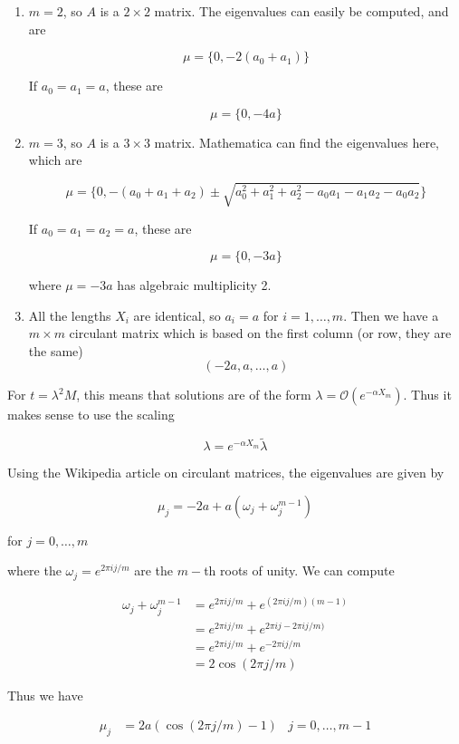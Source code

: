 \documentclass[12pt]{article}
\begin{document}
\begin{enumerate}
\item $m = 2$, so $A$ is a $2 \times 2$ matrix. The eigenvalues can easily be computed, and are

\[
\mu = \{ 0, -2(a_0 + a_1) \}
\]

If $a_0 = a_1 = a$, these are

\[
\mu = \{ 0, -4a \}
\]

\item $m = 3$, so $A$ is a $3 \times 3$ matrix. Mathematica can find the eigenvalues here, which are

\[
\mu = \{0,  -(a_0 + a_1 + a_2) \pm 
\sqrt{ a_0^2 + a_1^2 + a_2^2 - a_0 a_1 - a_1 a_2 - a_0 a_2 }\}
\]

If $a_0 = a_1 = a_2 = a$, these are

\[
\mu = \{0,  -3a \}
\]

where $\mu = -3a$ has algebraic multiplicity 2.


\item All the lengths $X_i$ are identical, so $a_i = a$ for $i = 1, \dots, m$. Then we have a $m \times m$ circulant matrix which is based on the first column (or row, they are the same)
\[
(-2a, a, \dots, a)
\]
\end{enumerate}

For $t = \lambda^2 M$, this means that solutions are of the form $\lambda = \mathcal{O}( e^{-\alpha X_m} )$. Thus it makes sense to use the scaling

\[
\lambda = e^{-\alpha X_m} \tilde{\lambda}
\] 

Using the Wikipedia article on circulant matrices, the eigenvalues are given by

\[
\mu_j = -2a + a( \omega_j + \omega_j^{m-1} )
\]

for $j = 0, \dots, m$

where the $\omega_j = e^{2 \pi i j / m}$ are the $m-$th roots of unity. We can compute

\begin{align*}
\omega_j + \omega_j^{m-1} &= e^{2 \pi i j / m} + e^{(2 \pi i j / m)(m-1)}\\
&= e^{2 \pi i j / m} + e^{2 \pi i j - 2 \pi i j / m)} \\
&= e^{2 \pi i j / m} + e^{-2 \pi i j/m} \\
&= 2 \cos( 2 \pi j/m )
\end{align*}

Thus we have

\begin{align*}
\mu_j &= 2 a( \cos( 2 \pi j/m ) - 1 ) & j = 0, \dots, m-1
\end{align*}
\end{document}
